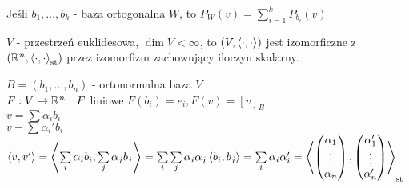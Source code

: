 \begin{wn} 
    Jeśli $b_1,\ldots,b_k$ - baza ortogonalna $W$, to $P_W(v) = \sum\limits_{i=1}^k P_{b_i}
    (v)$
\end{wn} 
\begin{ft} 
    $V $ - przestrzeń euklidesowa, $\dim V < \infty$, to $(V,\left\langle \cdot, \cdot \right\rangle )$ jest
    izomorficzne z $(\mathbb{R}^n,\left\langle \cdot, \cdot \right\rangle _{\text{st}})$ przez izomorfizm 
    zachowujący iloczyn skalarny. 
\end{ft} 
\begin{dd} 
    $B = (b_1,\ldots,b_n)$ - ortonormalna baza $V$ \\ 
    $F: V \to \mathbb{R}^n \quad F$ liniowe $F(b_i) = e_i, F(v) = [v]_B$ \\ 
    $v = \sum \alpha_i b_i$ \\ 
    $v - \sum \alpha_i'b_i$ \\ 
    $\left\langle v, v' \right\rangle = \left\langle \sum\limits_i\alpha_i b_i, \sum\limits_j\alpha_j b_j \right\rangle = 
    \sum\limits_i\sum\limits_j \alpha_i\alpha_j \left\langle b_i, b_j \right\rangle = \sum\limits_i \alpha_i
    \alpha_i' = \left\langle \begin{pmatrix} \alpha_1 \\ \vdots \\ \alpha_n \end{pmatrix}, \begin{pmatrix} \alpha_1' \\ \vdots \\ \alpha_n' \end{pmatrix} \right\rangle_{\text{st}}$
\end{dd} 

